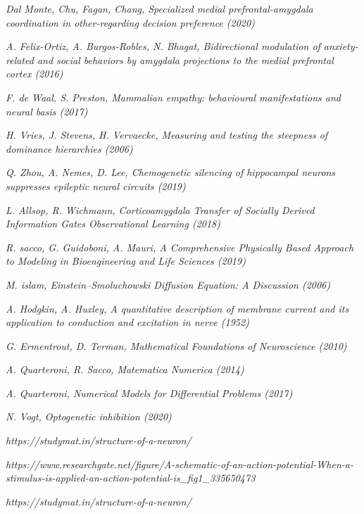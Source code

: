 \begin{thebibliography}{50}
	\textit{Dal Monte, Chu, Fagan, Chang, Specialized medial prefrontal-amygdala coordination in other-regarding decision preference (2020)}
	
	\textit{A. Felix-Ortiz, A. Burgos-Robles, N. Bhagat, Bidirectional modulation of anxiety-related and social behaviors by amygdala projections to the medial prefrontal cortex  (2016)}
	
	\textit{F. de Waal, S. Preston, Mammalian empathy: behavioural manifestations and neural basis (2017)}
	
	\textit{H. Vries, J. Stevens, H. Vervaecke, Measuring and testing the steepness of dominance hierarchies (2006)}
	
	\textit{Q. Zhou, A. Nemes, D. Lee, Chemogenetic silencing of hippocampal neurons suppresses epileptic neural circuits (2019)}
	
	\textit{L. Allsop, R. Wichmann, Corticoamygdala Transfer of Socially Derived Information Gates Observational Learning (2018)}
	
	\textit{R. sacco, G. Guidoboni, A. Mauri, A Comprehensive Physically Based Approach to Modeling in Bioengineering and Life Sciences (2019)}
	
	\textit{M. islam, Einstein–Smoluchowski Diffusion Equation: A Discussion (2006)}
	
	\textit{A. Hodgkin, A. Huxley, A quantitative description of membrane current and its application to conduction 
		and excitation in nerve (1952)}
	
	\textit{G. Ermentrout, D. Terman, Mathematical Foundations of Neuroscience (2010)}
	
	\textit{A. Quarteroni, R. Sacco, Matematica Numerica (2014)}
	
	\textit{A. Quarteroni, Numerical Models for Differential Problems (2017)}
	
	\textit{N. Vogt, Optogenetic inhibition (2020)}
	
	\textit{https://studymat.in/structure-of-a-neuron/}
	
	\textit{https://www.researchgate.net/figure/A-schematic-of-an-action-potential-When-a-stimulus-is-applied-an-action-potential-is_fig1_335650473}
	
	\textit{https://studymat.in/structure-of-a-neuron/}

\end{thebibliography}


